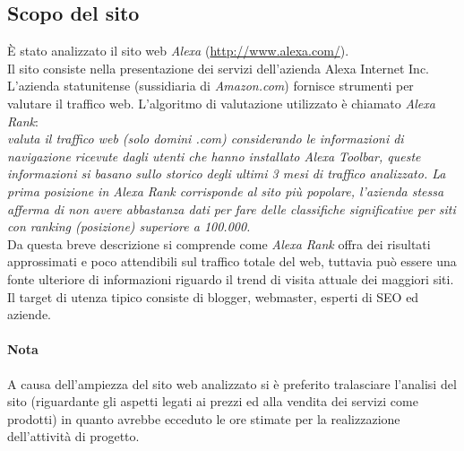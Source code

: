 \subsection{Scopo del sito}\label{scopo}
È stato analizzato il sito web \textit{Alexa} (\url{http://www.alexa.com/}). \\
Il sito consiste nella presentazione dei servizi dell'azienda Alexa Internet Inc. \\
L'azienda statunitense (sussidiaria di \textit{Amazon.com}) fornisce 
strumenti per valutare il traffico web. L'algoritmo di valutazione utilizzato è chiamato \textit{Alexa Rank}: \\
\textit{valuta il traffico web (solo domini .com) considerando le informazioni di navigazione ricevute dagli utenti che 
hanno installato Alexa Toolbar, queste informazioni si basano sullo 
storico degli ultimi 3 mesi di traffico analizzato.
La prima posizione in Alexa Rank corrisponde al sito più popolare, 
l'azienda stessa afferma di non avere abbastanza dati per fare delle classifiche 
significative per siti con ranking (posizione) superiore a 100.000.} \\
Da questa breve descrizione si comprende come \textit{Alexa Rank} offra dei risultati approssimati e poco attendibili sul traffico totale del web, tuttavia può 
essere una fonte ulteriore di informazioni riguardo il trend di visita attuale dei maggiori siti.\\ 
Il target di utenza tipico consiste di blogger, webmaster, esperti di SEO ed
aziende.\\
\paragraph{Nota}
 A causa dell'ampiezza del sito web analizzato si è preferito tralasciare l'analisi  del sito (riguardante gli aspetti
legati ai prezzi ed alla vendita dei servizi come prodotti) in quanto 
avrebbe ecceduto le ore stimate per la realizzazione dell'attività di progetto.
